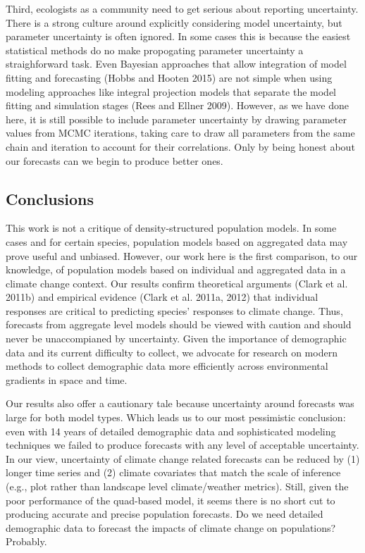 \documentclass[12pt,]{article}
\begin{document}
Third, ecologists as a community need to get serious about reporting
uncertainty. There is a strong culture around explicitly considering
model uncertainty, but parameter uncertainty is often ignored. In some
cases this is because the easiest statistical methods do no make
propogating parameter uncertainty a straighforward task. Even Bayesian
approaches that allow integration of model fitting and forecasting
(Hobbs and Hooten 2015) are not simple when using modeling approaches
like integral projection models that separate the model fitting and
simulation stages (Rees and Ellner 2009). However, as we have done here,
it is still possible to include parameter uncertainty by drawing
parameter values from MCMC iterations, taking care to draw all
parameters from the same chain and iteration to account for their
correlations. Only by being honest about our forecasts can we begin to
produce better ones.

\subsection{Conclusions}\label{conclusions}

This work is not a critique of density-structured population models. In
some cases and for certain species, population models based on
aggregated data may prove useful and unbiased. However, our work here is
the first comparison, to our knowledge, of population models based on
individual and aggregated data in a climate change context. Our results
confirm theoretical arguments (Clark et al. 2011b) and empirical
evidence (Clark et al. 2011a, 2012) that individual responses are
critical to predicting species' responses to climate change. Thus,
forecasts from aggregate level models should be viewed with caution and
should never be unaccompianed by uncertainty. Given the importance of
demographic data and its current difficulty to collect, we advocate for
research on modern methods to collect demographic data more efficiently
across environmental gradients in space and time.

Our results also offer a cautionary tale because uncertainty around
forecasts was large for both model types. Which leads us to our most
pessimistic conclusion: even with 14 years of detailed demographic data
and sophisticated modeling techniques we failed to produce forecasts
with any level of acceptable uncertainty. In our view, uncertainty of
climate change related forecasts can be reduced by (1) longer time
series and (2) climate covariates that match the scale of inference
(e.g., plot rather than landscape level climate/weather metrics). Still,
given the poor performance of the quad-based model, it seems there is no
short cut to producing accurate and precise population forecasts. Do we
need detailed demographic data to forecast the impacts of climate change
on populations? Probably.
\end{document}

